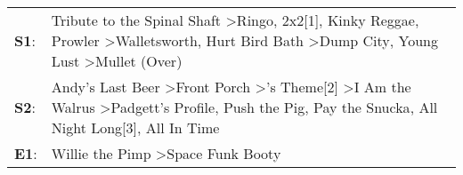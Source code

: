 \begin{supertabular}{p{0.03\textwidth}p{0.92\textwidth}}
 \textbf{S1}:  &  Tribute to the Spinal Shaft\textsuperscript{} \textgreater \enspace Ringo\textsuperscript{}, \enspace 2x2[1]\textsuperscript{}, \enspace Kinky Reggae\textsuperscript{}, \enspace Prowler\textsuperscript{} \textgreater \enspace Walletsworth\textsuperscript{}, \enspace Hurt Bird Bath\textsuperscript{} \textgreater \enspace Dump City\textsuperscript{}, \enspace Young Lust\textsuperscript{} \textgreater \enspace Mullet (Over)\textsuperscript{}  \enspace  \\
 \textbf{S2}:  &                    Andy's Last Beer\textsuperscript{} \textgreater \enspace Front Porch\textsuperscript{} \textgreater {}'s Theme[2]\textsuperscript{} \textgreater \enspace I Am the Walrus\textsuperscript{} \textgreater \enspace Padgett's Profile\textsuperscript{}, \enspace Push the Pig\textsuperscript{}, \enspace Pay the Snucka\textsuperscript{}, \enspace All Night Long[3]\textsuperscript{}, \enspace All In Time\textsuperscript{}  \enspace  \\
 \textbf{E1}:  &                                                                                                                                                                                                                                                                                                                                                                  Willie the Pimp\textsuperscript{} \textgreater \enspace Space Funk Booty\textsuperscript{}  \enspace  \\
\end{supertabular}
